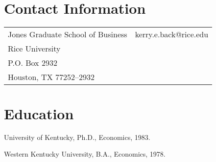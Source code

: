 \documentclass[margin, 11pt]{res}
\newenvironment{list1}{
  \begin{list}{}{%
            \setlength{\itemsep}{0in}
      \setlength{\parsep}{0in} \setlength{\parskip}{0in}
      \setlength{\topsep}{0in} \setlength{\partopsep}{0in}
      \setlength{\leftmargin}{0.2in}}}{\end{list}}
\begin{document}


\address{\monthyeardate\today\vspace*{0.1in}}


\begin{resume}


\section{\sc Contact Information}
\vspace{.05in}
\begin{tabular}{@{}p{3in}p{4in}}
\hspace{0.15in} Jones Graduate School of Business & kerry.e.back@rice.edu\\
\hspace{0.15in} Rice University & \\
\hspace{0.15in} P.O. Box 2932 & \\
\hspace{0.15in} Houston, TX  77252--2932 & \\
\end{tabular}




\section{\sc Education}

\begin{list1}
\item University of Kentucky, Ph.D., Economics, 1983.
\item Western Kentucky University, B.A., Economics,
1978.
\end{list1}


\end{resume}
\end{document}
